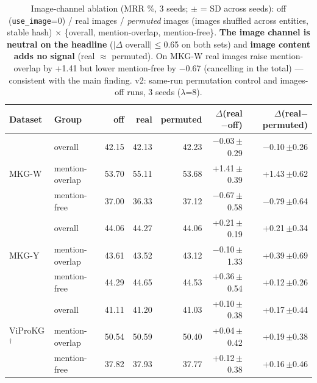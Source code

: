 \begin{table}[t]
\centering
\footnotesize
\setlength{\tabcolsep}{5pt}
\caption{Image-channel ablation (MRR \%, 3 seeds; $\pm$ = SD across seeds): off (\texttt{use\_image}=0) / real images / \emph{permuted} images (images shuffled across entities, stable hash) $\times$ \{overall, mention-overlap, mention-free\}. \textbf{The image channel is neutral on the headline} ($|\Delta$ overall$|\le$0.65 on both sets) and \textbf{image content adds no signal} (real $\approx$ permuted). On MKG-W real images raise mention-overlap by +1.41 but lower mention-free by $-$0.67 (cancelling in the total) --- consistent with the main finding. v2: same-run permutation control and images-off runs, 3 seeds ($\lambda$=8).}
\label{tab:anh}
\begin{tabular}{l l r r r r r}
\toprule
Dataset & Group & off & real & permuted & $\Delta$(real$-$off) & $\Delta$(real$-$permuted) \\
\midrule
\multirow{3}{*}{MKG-W} & overall & 42.15 & 42.13 & 42.23 & $-$0.03\,$\pm$0.29 & $-$0.10\,$\pm$0.26 \\
 & mention-overlap & 53.70 & 55.11 & 53.68 & +1.41\,$\pm$0.39 & +1.43\,$\pm$0.62 \\
 & mention-free & 37.00 & 36.33 & 37.12 & $-$0.67\,$\pm$0.58 & $-$0.79\,$\pm$0.64 \\
\midrule
\multirow{3}{*}{MKG-Y} & overall & 44.06 & 44.27 & 44.06 & +0.21\,$\pm$0.19 & +0.21\,$\pm$0.34 \\
 & mention-overlap & 43.61 & 43.52 & 43.12 & $-$0.10\,$\pm$1.33 & +0.39\,$\pm$0.69 \\
 & mention-free & 44.29 & 44.65 & 44.53 & +0.36\,$\pm$0.54 & +0.12\,$\pm$0.26 \\
\midrule
\multirow{3}{*}{ViProKG$^{\dagger}$} & overall & 41.11 & 41.20 & 41.03 & +0.10\,$\pm$0.38 & +0.17\,$\pm$0.44 \\
 & mention-overlap & 50.54 & 50.59 & 50.40 & +0.04\,$\pm$0.42 & +0.19\,$\pm$0.38 \\
 & mention-free & 37.82 & 37.93 & 37.77 & +0.12\,$\pm$0.38 & +0.16\,$\pm$0.46 \\
\bottomrule
\end{tabular}


\end{table}
